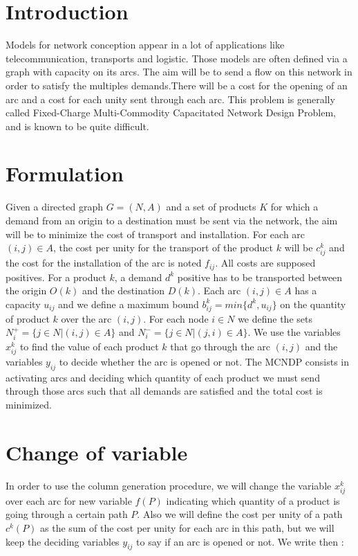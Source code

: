 \newpage\cleardoublepage{}
\section{Introduction}
Models for network conception appear in a lot of applications like telecommunication, transports and logistic. Those models are often defined via a graph with capacity on its arcs. The aim will be to send a flow on this network in order to satisfy the multiples demands.There will be a cost for the opening of an arc and a cost for each unity sent through each arc. This problem is generally called Fixed-Charge Multi-Commodity Capacitated Network Design Problem, and is known to be quite difficult.

\section{Formulation}
Given a directed graph $G=(N,A)$ and a set of products $K$ for which a demand from an origin to a destination must be sent via the network, the aim will be to minimize the cost of transport and installation. For each arc $(i,j) \in A$, the cost per unity for the transport of the product $k$ will be $c^k_{ij}$ and the cost for the installation of the arc is noted $f_{ij}$. All costs are supposed positives. For a product $k$, a demand $d^k$ positive has to be transported between the origin $O(k)$ and the destination $D(k)$. Each arc $(i,j) \in A$ has a capacity $u_{ij}$ and we define a maximum bound $b^k_{ij}=min\{d^k,u_{ij}\}$ on the quantity of product $k$ over the arc $(i,j)$. For each node $i \in N$ we define the sets $N^+_i=\{j\in N|(i,j)\in A\}$ and $N^-_i=\{j\in N|(j,i)\in A\}$. We use the variables $x^k_{ij}$ to find the value of each product $k$ that go through the arc $(i,j)$ and the variables $y_{ij}$ to decide whether the arc is opened or not. The MCNDP consists in activating arcs and deciding which quantity of each product we must send through those arcs such that all demands are satisfied and the total cost is minimized.

\section{Change of variable}
In order to use the column generation procedure, we will change the variable $x^k_{ij}$ over each arc for new variable $f(P)$ indicating which quantity of a product is going through a certain path $P$. Also we will define the cost per unity of a path $c^k (P)$ as the sum of the cost per unity for each arc in this path, but we will keep the deciding variables $y_{ij}$ to say if an arc is opened or not. We write then :

